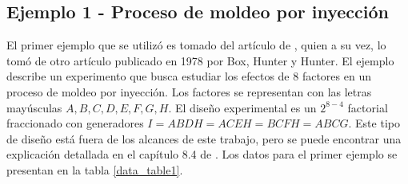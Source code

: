 \subsection{Ejemplo 1 - Proceso de moldeo por inyección}

El primer ejemplo que se utilizó es tomado del artículo de \cite{meyer1996}, quien a su vez, lo tomó de otro artículo publicado en 1978 por Box, Hunter y Hunter. El ejemplo describe un experimento que busca estudiar los efectos de 8 factores en un proceso de moldeo por inyección. Los factores se representan con las letras mayúsculas $A, B, C, D, E, F, G, H$. El diseño experimental es un $2^{8-4}$ factorial fraccionado con generadores $I = ABDH = ACEH = BCFH = ABCG$. Este tipo de diseño está fuera de los alcances de este trabajo, pero se puede encontrar una explicación detallada en el capítulo 8.4 de \cite{montgomery2017design}. Los datos para el primer ejemplo se presentan en la tabla \ref{data_table1}. 

